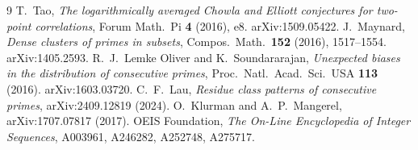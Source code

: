 \documentclass[11pt]{amsart}
\theoremstyle{remark}
\begin{document}
\begin{thebibliography}{9}
 T.~Tao, \emph{The logarithmically averaged Chowla and Elliott conjectures for two-point correlations}, Forum Math.\ Pi \textbf{4} (2016), e8. arXiv:1509.05422.
 J.~Maynard, \emph{Dense clusters of primes in subsets}, Compos.\ Math.\ \textbf{152} (2016), 1517--1554. arXiv:1405.2593.
 R.~J.~Lemke Oliver and K.~Soundararajan, \emph{Unexpected biases in the distribution of consecutive primes}, Proc.\ Natl.\ Acad.\ Sci.\ USA \textbf{113} (2016). arXiv:1603.03720.
 C.~F.~Lau, \emph{Residue class patterns of consecutive primes}, arXiv:2409.12819 (2024).
 O.~Klurman and A.~P.~Mangerel, arXiv:1707.07817 (2017).
 OEIS Foundation, \emph{The On-Line Encyclopedia of Integer Sequences}, A003961, A246282, A252748, A275717.
\end{thebibliography}
\end{document}
